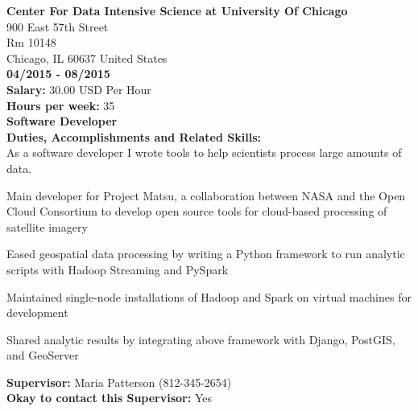 \noindent\textbf{Center For Data Intensive Science at University Of Chicago}\\
900 East 57th Street\\
Rm 10148\\
Chicago, IL   60637 United States\\
\textbf{04/2015 - 08/2015}\\
\textbf{Salary:} 30.00  USD Per Hour\\
\textbf{Hours per week:} 35\\
\textbf{Software Developer}\\
\textbf{Duties, Accomplishments and Related Skills:}\\
As a software developer I wrote tools to help scientists process large amounts of data.
\begin{tightlist}

\item Main developer for Project Matsu, a collaboration between NASA and the Open Cloud Consortium to develop open source tools for cloud-based processing of satellite imagery

\item Eased geospatial data processing by writing a Python framework to run analytic scripts with Hadoop Streaming and PySpark

\item Maintained single-node installations of Hadoop and Spark on virtual machines for development

\item Shared analytic results by integrating above framework with Django, PostGIS, and GeoServer
\end{tightlist}
\textbf{Supervisor:} Maria Patterson (812-345-2654)\\
\textbf{Okay to contact this Supervisor:} Yes\\

